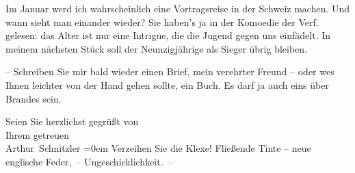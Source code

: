 \pstart
           Im Januar werd ich wahrscheinlich eine Vortragsreise in der Schweiz machen. Und wann sieht man einander
               wieder? Sie haben’s ja in der Komoedie der Verf.
               gelesen: das Alter ist nur eine Intrigue, die die Jugend gegen uns einfädelt. In
               meinem nächsten Stück soll der
               Neunzigjährige als Sieger übrig bleiben.\pend
           
\pstart
           {\pb}– Schreiben Sie mir bald wieder einen Brief, mein
               verehrter Freund – oder we{\geminationn}s Ihnen leichter von der Hand
               gehen sollte, ein Buch. Es darf ja auch eins über Brandes sein.\pend
           
\pstart
           Seien Sie herzlichst gegrüßt von{\\[\baselineskip]}Ihrem getreuen{\\[\baselineskip]}\spacefill\mbox{Arthur Schnitzler}\pend
           \leftskip=0em{}
\pstart
           \noindent{}Verzeihen Sie die Klexe! Fließende Tinte – neue englische Feder, – Ungeschicklichkeit. –\pend
           \endnumbering{}  \newcommand{\dateiname}{L02423}\newcommand{\titel}{Arthur Schnitzler an Georg Brandes, 14. 12. 1924}\newcommand{\editorInnen}{Martin Anton Müller und Gerd-Hermann Susen}
